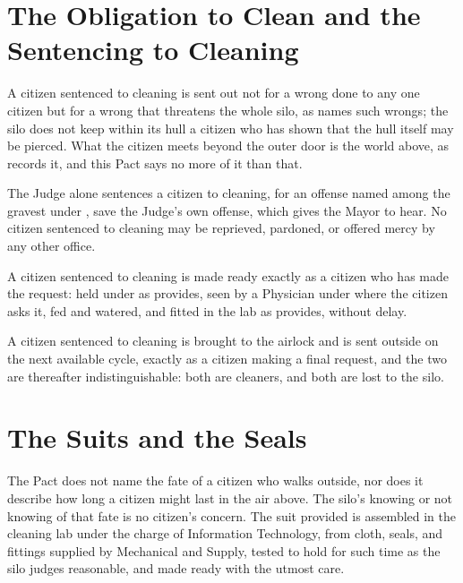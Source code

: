 \section{The Obligation to Clean and the Sentencing to Cleaning}
\label{sec:cleaning:obligation-to-clean-and-the-sentencing-to-cleaning}

A citizen sentenced to cleaning is sent out not for a wrong done to any one citizen but for a wrong that threatens the whole silo, as  names such wrongs; the silo does not keep within its hull a citizen who has shown that the hull itself may be pierced. What the citizen meets beyond the outer door is the world above, as  records it, and this Pact says no more of it than that.

\begin{clauses}
\item The Judge alone sentences a citizen to cleaning, for an offense named among the gravest under , save the Judge's own offense, which  gives the Mayor to hear. No citizen sentenced to cleaning may be reprieved, pardoned, or offered mercy by any other office.
\item A citizen sentenced to cleaning is made ready exactly as a citizen who has made the request: held under  as  provides, seen by a Physician under  where the citizen asks it, fed and watered, and fitted in the lab as  provides, without delay.
\item A citizen sentenced to cleaning is brought to the airlock and is sent outside on the next available cycle, exactly as a citizen making a final request, and the two are thereafter indistinguishable: both are cleaners, and both are lost to the silo.
\end{clauses}

\section{The Suits and the Seals}
\label{sec:cleaning:suits-and-the-seals}

The Pact does not name the fate of a citizen who walks outside, nor does it describe how long a citizen might last in the air above. The silo's knowing or not knowing of that fate is no citizen's concern. The suit provided is assembled in the cleaning lab under the charge of Information Technology, from cloth, seals, and fittings supplied by Mechanical and Supply, tested to hold for such time as the silo judges reasonable, and made ready with the utmost care.

